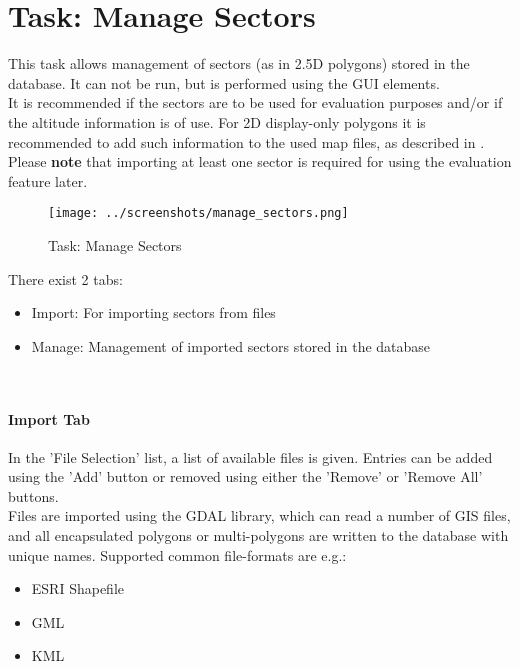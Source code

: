 \section{Task: Manage Sectors}
\label{sec:task_manage_sectors} 

This task allows management of sectors (as in 2.5D polygons) stored in the database. It can not be run, but is performed using the GUI elements. \\

It is recommended if the sectors are to be used for evaluation purposes and/or if the altitude information is of use. For 2D display-only polygons it is recommended to add such information to the used map files, as described in . \\

Please \textbf{note} that importing at least one sector is required for using the evaluation feature later.

\begin{figure}[H]
  \hspace*{-2.5cm}
    \texttt{[image: ../screenshots/manage\_sectors.png]}
  \caption{Task: Manage Sectors}
\end{figure}

There exist 2 tabs:

\begin{itemize}  
\item Import: For importing sectors from files
\item Manage: Management of imported sectors stored in the database
\end{itemize}
\ \\

\paragraph {Import Tab}

In the 'File Selection' list, a list of available files is given. Entries can be added using the 'Add' button or removed using either the 'Remove' or 'Remove All' buttons. \\

Files are imported using the GDAL library, which can read a number of GIS files, and all encapsulated polygons or multi-polygons are written to the database with unique names. Supported common file-formats are e.g.:

\begin{itemize}  
\item ESRI Shapefile
\item GML
\item KML
\end{itemize}
\ \\

